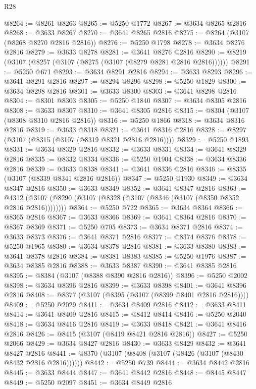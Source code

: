 \begin{lexlean}{R28}
\begin{coremodule}
@8264 := @8261 @8263
@8265 := @5250 @1772
@8267 := @3634 @8265 @2816
@8268 := @3633 @8267
@8270 := @3641 @8265 @2816
@8275 := @8264 (@3107 (@8268 @8270 @2816 @2816))
@8276 := @5250 @1798
@8278 := @3634 @8276 @2816
@8279 := @3633 @8278
@8281 := @3641 @8276 @2816
@8290 := @8219 (@3107 (@8257 (@3107 (@8275 (@3107 (@8279 @8281 @2816 @2816))))))
@8291 := @5250 @671
@8293 := @3634 @8291 @2816
@8294 := @3633 @8293
@8296 := @3641 @8291 @2816
@8297 := @8294 @8296
@8298 := @5250 @1829
@8300 := @3634 @8298 @2816
@8301 := @3633 @8300
@8303 := @3641 @8298 @2816
@8304 := @8301 @8303
@8305 := @5250 @1840
@8307 := @3634 @8305 @2816
@8308 := @3633 @8307
@8310 := @3641 @8305 @2816
@8315 := @8304 (@3107 (@8308 @8310 @2816 @2816))
@8316 := @5250 @1866
@8318 := @3634 @8316 @2816
@8319 := @3633 @8318
@8321 := @3641 @8316 @2816
@8328 := @8297 (@3107 (@8315 (@3107 (@8319 @8321 @2816 @2816))))
@8329 := @5250 @1893
@8331 := @3634 @8329 @2816
@8332 := @3633 @8331
@8334 := @3641 @8329 @2816
@8335 := @8332 @8334
@8336 := @5250 @1904
@8338 := @3634 @8336 @2816
@8339 := @3633 @8338
@8341 := @3641 @8336 @2816
@8346 := @8335 (@3107 (@8339 @8341 @2816 @2816))
@8347 := @5250 @1930
@8349 := @3634 @8347 @2816
@8350 := @3633 @8349
@8352 := @3641 @8347 @2816
@8363 := @4312 (@3107 (@8290 (@3107 (@8328 (@3107 (@8346 (@3107 (@8350 @8352 @2816 @2816))))))))
@8364 := @5250 @722
@8365 := @3634 @8364
@8366 := @8365 @2816
@8367 := @3633 @8366
@8369 := @3641 @8364 @2816
@8370 := @8367 @8369
@8371 := @5250 @705
@8373 := @3634 @8371 @2816
@8374 := @3633 @8373
@8376 := @3641 @8371 @2816
@8377 := @8374 @8376
@8378 := @5250 @1965
@8380 := @3634 @8378 @2816
@8381 := @3633 @8380
@8383 := @3641 @8378 @2816
@8384 := @8381 @8383
@8385 := @5250 @1976
@8387 := @3634 @8385 @2816
@8388 := @3633 @8387
@8390 := @3641 @8385 @2816
@8395 := @8384 (@3107 (@8388 @8390 @2816 @2816))
@8396 := @5250 @2002
@8398 := @3634 @8396 @2816
@8399 := @3633 @8398
@8401 := @3641 @8396 @2816
@8408 := @8377 (@3107 (@8395 (@3107 (@8399 @8401 @2816 @2816))))
@8409 := @5250 @2029
@8411 := @3634 @8409 @2816
@8412 := @3633 @8411
@8414 := @3641 @8409 @2816
@8415 := @8412 @8414
@8416 := @5250 @2040
@8418 := @3634 @8416 @2816
@8419 := @3633 @8418
@8421 := @3641 @8416 @2816
@8426 := @8415 (@3107 (@8419 @8421 @2816 @2816))
@8427 := @5250 @2066
@8429 := @3634 @8427 @2816
@8430 := @3633 @8429
@8432 := @3641 @8427 @2816
@8441 := @8370 (@3107 (@8408 (@3107 (@8426 (@3107 (@8430 @8432 @2816 @2816))))))
@8442 := @5250 @739
@8444 := @3634 @8442 @2816
@8445 := @3633 @8444
@8447 := @3641 @8442 @2816
@8448 := @8445 @8447
@8449 := @5250 @2097
@8451 := @3634 @8449 @2816

\end{coremodule}
\end{lexlean}
